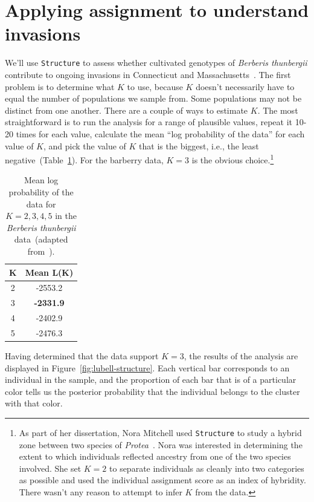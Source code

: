 \documentclass[12pt]{article}
\begin{document}
\section*{Applying assignment to understand invasions}

We'll use {\tt Structure} to
assess whether cultivated genotypes of {\it Berberis
  thunbergii\/}
contribute to ongoing invasions in Connecticut and
Massachusetts~\cite{Lubell-etal-2008}. The first problem is to determine what $K$
to use, because $K$ doesn't necessarily have to equal the number of
populations we sample from. Some populations may not be distinct from
one another. There are a couple of ways to estimate $K$. The most
straightforward is to run the analysis for a range of plausible
values, repeat it 10-20 times for each value, calculate the mean ``log
probability of the data'' for each value of $K$, and pick the value of
$K$ that is the biggest, i.e., the least
negative~(Table~\ref{table:berberis-k}). For the barberry data, $K=3$
is the obvious choice.\footnote{As part of her dissertation, Nora
  Mitchell used {\tt Structure} to study a hybrid zone between two
  species of {\it Protea}~\cite{Mitchell-Holsinger-2018}. Nora was
  interested in determining the extent to which individuals reflected
  ancestry from one of the two species involved. She set $K=2$ to
  separate individuals as cleanly into two categories as possible and
  used the individual assignment score as an index of hybridity. There
  wasn't any reason to attempt to infer $K$ from the data.}

\begin{table}
\begin{center}
\begin{tabular}{cc}
\hline\hline
K & Mean L(K) \\
\hline
2 & -2553.2 \\
3 & {\bf -2331.9} \\
4 & -2402.9 \\
5 & -2476.3 \\
\hline
\end{tabular}
\end{center}
\caption{Mean log probability of the data for $K=2,3,4,5$ in the {\it
    Berberis thunbergii\/} data~(adapted
  from~\cite{Lubell-etal-2008}).}\label{table:berberis-k}
\end{table}

Having determined that the data support $K=3$, the results of the
analysis are displayed in Figure~\ref{fig:lubell-structure}. Each
vertical bar corresponds to an individual in the sample, and the
proportion of each bar that is of a particular color tells us the
posterior probability that the individual belongs to the cluster with
that color.
\end{document}
